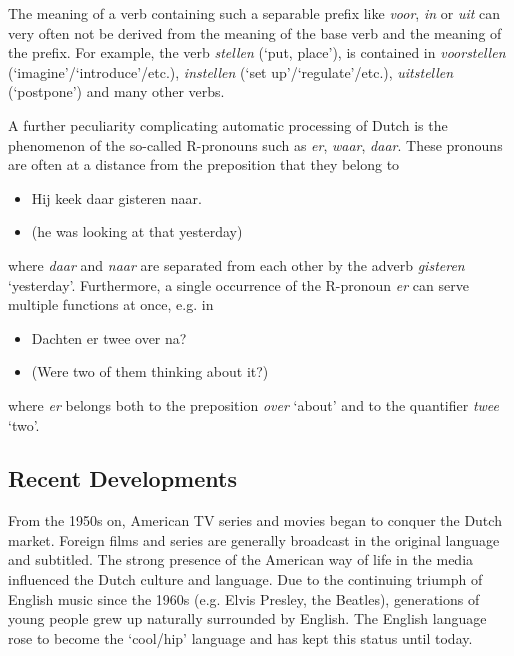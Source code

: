 \begin{multicols}{2}
    The meaning of a verb containing such a separable prefix like \textit{voor}, \textit{in} or \textit{uit} can very often not be derived from the meaning of the base verb and the meaning of the prefix. For example, the verb \textit{stellen} (`put, place'), is contained in \textit{voorstellen} (`imagine'/`introduce'/etc.), \textit{instellen} (`set up'/`regulate'/etc.), \textit{uitstellen} (`postpone') and many other verbs.


    A further peculiarity complicating automatic processing of Dutch is the phenomenon of the so-called R-pronouns such as \textit{er}, \textit{waar}, \textit{daar}. These pronouns are often at a distance from the preposition that they belong to

\begin{itemize}
\item Hij keek daar gisteren naar.
    \item (he was looking at that yesterday)
\end{itemize}

    where \textit{daar} and \textit{naar} are separated from each other by the adverb \textit{gisteren} `yesterday'.
    Furthermore, a single occurrence of the R-pronoun \textit{er} can serve multiple functions at once, e.g. in\\

\begin{itemize}
\item Dachten er twee over na?
\item (Were two of them thinking about it?)
\end{itemize}



    where \textit{er} belongs both to the preposition \textit{over} `about' and to the quantifier \textit{twee} `two'.

\subsection{Recent Developments}

From the 1950s on, American TV series and movies began to conquer the Dutch market. Foreign films and series are generally broadcast in the original language and subtitled. The strong presence of the American way of life in the media influenced the Dutch culture and language.  Due to the continuing triumph of English music since the 1960s (e.g. Elvis Presley, the Beatles), generations of young people grew up naturally surrounded by English. The English language rose to become the `cool/hip' language and has kept this status until today.


\end{multicols}
